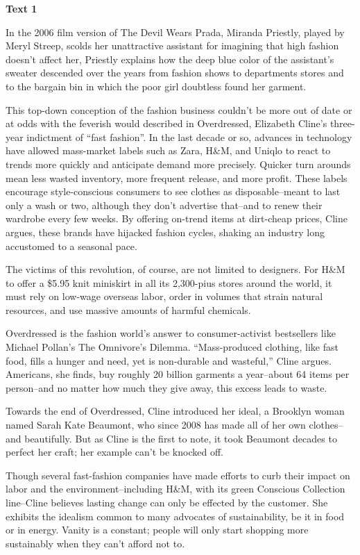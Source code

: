 \begin{center}\textbf{Text 1}\end{center}

In the 2006 film version of The Devil Wears Prada, Miranda Priestly, played by Meryl Streep, scolds her unattractive assistant for imagining that high fashion doesn't affect her, Priestly explains how the deep blue color of the assistant's sweater descended over the years from fashion shows to departments stores and to the bargain bin in which the poor girl doubtless found her garment.

This top-down conception of the fashion business couldn't be more out of date or at odds with the feverish would described in Overdressed, Elizabeth Cline's three-year indictment of ``fast fashion''. In the last decade or so, advances in technology have allowed mass-market labels such as Zara, H\&M, and Uniqlo to react to trends more quickly and anticipate demand more precisely. Quicker turn arounds mean less wasted inventory, more frequent release, and more profit. These labels encourage style-conscious consumers to see clothes as disposable--meant to last only a wash or two, although they don't advertise that--and to renew their wardrobe every few weeks. By offering on-trend items at dirt-cheap prices, Cline argues, these brands have hijacked fashion cycles, shaking an industry long accustomed to a seasonal pace.

The victims of this revolution, of course, are not limited to designers. For H\&M to offer a \$5.95 knit miniskirt in all its 2,300-pius stores around the world, it must rely on low-wage overseas labor, order in volumes that strain natural resources, and use massive amounts of harmful chemicals.

Overdressed is the fashion world's answer to consumer-activist bestsellers like Michael Pollan's The Omnivore’s Dilemma. ``Mass-produced clothing, like fast food, fills a hunger and need, yet is non-durable and wasteful,'' Cline argues. Americans, she finds, buy roughly 20 billion garments a year--about 64 items per person--and no matter how much they give away, this excess leads to waste.

Towards the end of Overdressed, Cline introduced her ideal, a Brooklyn woman named Sarah Kate Beaumont, who since 2008 has made all of her own clothes--and beautifully. But as Cline is the first to note, it took Beaumont decades to perfect her craft; her example can't be knocked off.

Though several fast-fashion companies have made efforts to curb their impact on labor and the environment--including H\&M, with its green Conscious Collection line--Cline believes lasting change can only be effected by the customer. She exhibits the idealism common to many advocates of sustainability, be it in food or in energy. Vanity is a constant; people will only start shopping more sustainably when they can't afford not to.

